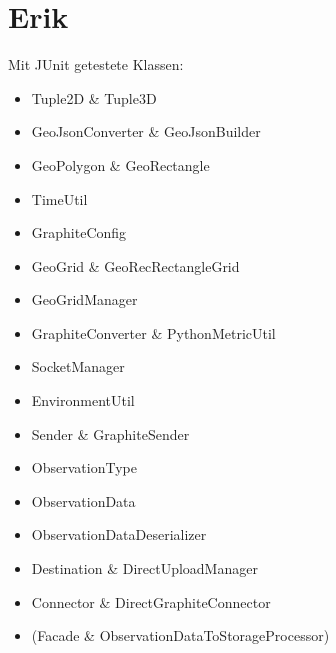 \section{Erik}
Mit JUnit getestete Klassen:
\begin{itemize}
	\item Tuple2D \& Tuple3D
	\item GeoJsonConverter \& GeoJsonBuilder
	\item GeoPolygon \& GeoRectangle
	\item TimeUtil
	\item GraphiteConfig
	\item GeoGrid \& GeoRecRectangleGrid
	\item GeoGridManager
	\item GraphiteConverter \& PythonMetricUtil
	\item SocketManager
	\item EnvironmentUtil
	\item Sender \& GraphiteSender
	\item ObservationType
	\item ObservationData
	\item ObservationDataDeserializer
	\item Destination \& DirectUploadManager
	\item Connector \& DirectGraphiteConnector
	\item (Facade \& ObservationDataToStorageProcessor)
\end{itemize}